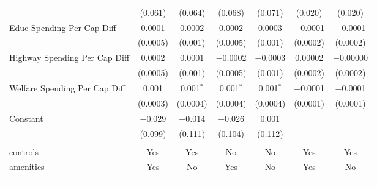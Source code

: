 \begin{table}[!htbp]
\begin{tabular}{@{\extracolsep{5pt}}lcccccc}
  & (0.061) & (0.064) & (0.068) & (0.071) & (0.020) & (0.020) \\ 
  Educ Spending Per Cap Diff & 0.0001 & 0.0002 & 0.0002 & 0.0003 & $-$0.0001 & $-$0.0001 \\ 
  & (0.0005) & (0.001) & (0.0005) & (0.001) & (0.0002) & (0.0002) \\ 
  Highway Spending Per Cap Diff & 0.0002 & 0.0001 & $-$0.0002 & $-$0.0003 & 0.00002 & $-$0.00000 \\ 
  & (0.0005) & (0.001) & (0.0005) & (0.001) & (0.0002) & (0.0002) \\ 
  Welfare Spending Per Cap Diff & 0.001 & 0.001$^{*}$ & 0.001$^{*}$ & 0.001$^{*}$ & $-$0.0001 & $-$0.0001 \\ 
  & (0.0003) & (0.0004) & (0.0004) & (0.0004) & (0.0001) & (0.0001) \\ 
  Constant & $-$0.029 & $-$0.014 & $-$0.026 & 0.001 &  &  \\ 
  & (0.099) & (0.111) & (0.104) & (0.112) &  &  \\ 
 \hline \\[-1.8ex] 
controls & Yes & Yes & No & No & Yes & Yes \\ 
amenities & Yes & No & Yes & No & Yes & No \\ 
\hline \\[-1.8ex] 
\hline 
\hline \\[-1.8ex] 
\end{tabular} 
\end{table} 
